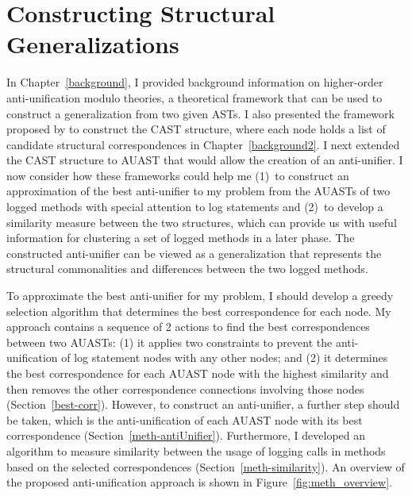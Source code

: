 \chapter{Constructing Structural Generalizations} \label{ch4} \label{methodology}

In Chapter~\ref{background}, I provided background information on higher-order anti-unification modulo theories, a theoretical framework that can be used to construct a generalization from two given ASTs. I also presented the framework proposed by \citet{2008:fse:cottrell} to construct the CAST structure, where each node holds a list of candidate structural correspondences in Chapter~\ref{background2}. I next extended the CAST structure to AUAST that would allow the creation of an anti-unifier. I now consider how these frameworks could help me (1)~to construct an approximation of the best anti-unifier to my problem from the AUASTs of two logged methods with special attention to log statements and (2)~to develop a similarity measure between the two structures, which can provide us with useful information for clustering a set of logged methods in a later phase. The constructed anti-unifier can be viewed as a generalization that represents the structural commonalities and differences between the two logged methods.




To approximate the best anti-unifier for my problem, I should develop a greedy selection algorithm that determines the best correspondence for each node. My approach contains a sequence of 2 actions to find the best correspondences between two AUASTs: (1) it applies two constraints to prevent the anti-unification of log statement nodes with any other nodes; and (2) it determines the best correspondence for each AUAST node with the highest similarity and then removes the other correspondence connections involving those nodes (Section~\ref{best-corr}). However, to construct an anti-unifier, a further step should be taken, which is the anti-unification of each AUAST node with its best correspondence (Section~\ref{meth-antiUnifier}). Furthermore, I developed an algorithm to measure similarity between the usage of logging calls in methods based on the selected correspondences (Section~\ref{meth-similarity}). An overview of the proposed anti-unification approach is shown in Figure~\ref{fig:meth_overview}.





